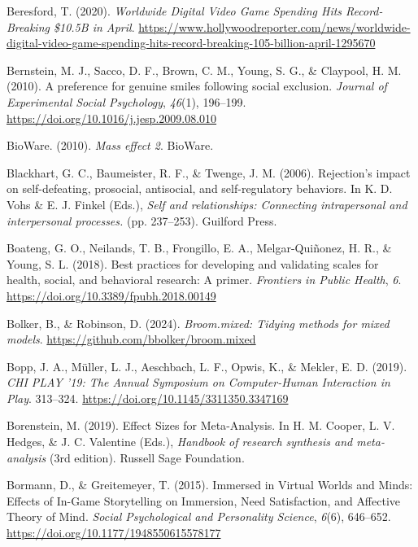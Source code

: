 \documentclass[
]{udthesis}
\newlength{\cslhangindent}
\newenvironment{CSLReferences}[2] %
 {\begin{list}{}{%
  \setlength{\itemindent}{0pt}
  \setlength{\leftmargin}{0pt}
  \setlength{\parsep}{0pt}
  \ifodd #1
   \setlength{\leftmargin}{\cslhangindent}
   \setlength{\itemindent}{-1\cslhangindent}
  \fi
  \setlength{\itemsep}{#2\baselineskip}}}
 {\end{list}}
\begin{document}
\begin{CSLReferences}{1}{0}
Beresford, T. (2020). \emph{Worldwide Digital Video Game Spending Hits Record-Breaking {\$}10.5B in April}. \url{https://www.hollywoodreporter.com/news/worldwide-digital-video-game-spending-hits-record-breaking-105-billion-april-1295670}

Bernstein, M. J., Sacco, D. F., Brown, C. M., Young, S. G., \& Claypool, H. M. (2010). A preference for genuine smiles following social exclusion. \emph{Journal of Experimental Social Psychology}, \emph{46}(1), 196--199. \url{https://doi.org/10.1016/j.jesp.2009.08.010}

BioWare. (2010). \emph{Mass effect 2}. BioWare.

Blackhart, G. C., Baumeister, R. F., \& Twenge, J. M. (2006). Rejection's impact on self-defeating, prosocial, antisocial, and self-regulatory behaviors. In K. D. Vohs \& E. J. Finkel (Eds.), \emph{Self and relationships: {Connecting} intrapersonal and interpersonal processes.} (pp. 237--253). {Guilford Press}.

Boateng, G. O., Neilands, T. B., Frongillo, E. A., Melgar-Quiñonez, H. R., \& Young, S. L. (2018). Best practices for developing and validating scales for health, social, and behavioral research: A primer. \emph{Frontiers in Public Health}, \emph{6}. \url{https://doi.org/10.3389/fpubh.2018.00149}

Bolker, B., \& Robinson, D. (2024). \emph{Broom.mixed: Tidying methods for mixed models}. \url{https://github.com/bbolker/broom.mixed}

Bopp, J. A., Müller, L. J., Aeschbach, L. F., Opwis, K., \& Mekler, E. D. (2019). \emph{CHI PLAY '19: The Annual Symposium on Computer-Human Interaction in Play}. 313--324. \url{https://doi.org/10.1145/3311350.3347169}

Borenstein, M. (2019). Effect {Sizes} for {Meta}-{Analysis}. In H. M. Cooper, L. V. Hedges, \& J. C. Valentine (Eds.), \emph{Handbook of research synthesis and meta-analysis} (3rd edition). {Russell Sage Foundation}.

Bormann, D., \& Greitemeyer, T. (2015). Immersed in {Virtual Worlds} and {Minds}: {Effects} of {In}-{Game Storytelling} on {Immersion}, {Need Satisfaction}, and {Affective Theory} of {Mind}. \emph{Social Psychological and Personality Science}, \emph{6}(6), 646--652. \url{https://doi.org/10.1177/1948550615578177}


\end{CSLReferences}
\end{document}
